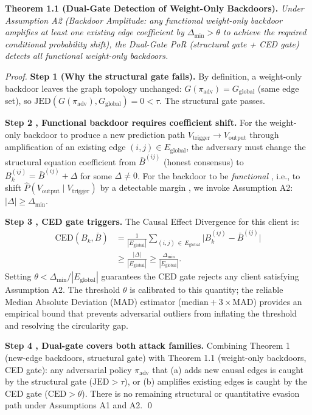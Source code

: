 \documentclass[journal]{IEEEtran}
\begin{document}
\textbf{Theorem 1.1 (Dual-Gate Detection of Weight-Only Backdoors).} \emph{Under Assumption A2 (Backdoor Amplitude: any functional weight-only backdoor amplifies at least one existing edge coefficient by $\Delta_{\min} > \theta$ to achieve the required conditional probability shift), the Dual-Gate PoR (structural gate + CED gate) detects all functional weight-only backdoors.}

\begin{proof}
\textbf{Step 1 (Why the structural gate fails).}
By definition, a weight-only backdoor leaves the graph topology unchanged: $G(\pi_{\text{adv}}) = G_{\text{global}}$ (same edge set), so $\text{JED}(G(\pi_{\text{adv}}), G_{\text{global}}) = 0 < \tau$. The structural gate passes.

\textbf{Step 2 , Functional backdoor requires coefficient shift.}
For the weight-only backdoor to produce a new prediction path $V_{\text{trigger}} \to V_{\text{output}}$ through amplification of an existing edge $(i,j) \in E_{\text{global}}$, the adversary must change the structural equation coefficient from $\bar{B}^{(ij)}$ (honest consensus) to $B_k^{(ij)} = \bar{B}^{(ij)} + \Delta$ for some $\Delta \ne 0$. For the backdoor to be \emph{functional} ,  i.e., to shift $\hat{P}(V_{\text{output}} \mid V_{\text{trigger}})$ by a detectable margin , we invoke Assumption A2: $|\Delta| \geq \Delta_{\min}$.

\textbf{Step 3 ,  CED gate triggers.}
The Causal Effect Divergence for this client is:
\[
\begin{split}
\text{CED}(B_k, \bar{B})
&= \frac{1}{|E_{\text{global}}|}
 \sum_{(i,j)\,\in\,E_{\text{global}}}
 \bigl|B_k^{(ij)} - \bar{B}^{(ij)}\bigr| \\[4pt]
&\geq \frac{|\Delta|}{|E_{\text{global}}|}
\geq \frac{\Delta_{\min}}{|E_{\text{global}}|}. \end{split}
\]
Setting $\theta < \Delta_{\min} / |E_{\text{global}}|$ guarantees the CED gate rejects any client satisfying Assumption A2. The threshold $\theta$ is calibrated to this quantity; the reliable Median Absolute Deviation (MAD) estimator ($\text{median} + 3\times\text{MAD}$) provides an empirical bound that prevents adversarial outliers from inflating the threshold and resolving the circularity gap.

\textbf{Step 4 , Dual-gate covers both attack families.}
Combining Theorem 1 (new-edge backdoors, structural gate) with Theorem 1.1 (weight-only backdoors, CED gate): any adversarial policy $\pi_{\text{adv}}$ that (a) adds new causal edges is caught by the structural gate ($\text{JED} > \tau$), or (b) amplifies existing edges is caught by the CED gate ($\text{CED} > \theta$). There is no remaining structural or quantitative evasion path under Assumptions A1 and A2. \qed
\end{proof}
\end{document}
